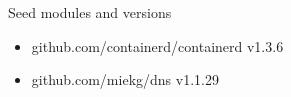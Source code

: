 \begin{table}[ht]
  \caption{Seed modules and versions}
  \label{table:seed}
  \begin{itemize}
  \item github.com/containerd/containerd v1.3.6
  \item github.com/miekg/dns v1.1.29


  \end{itemize}
\end{table}
